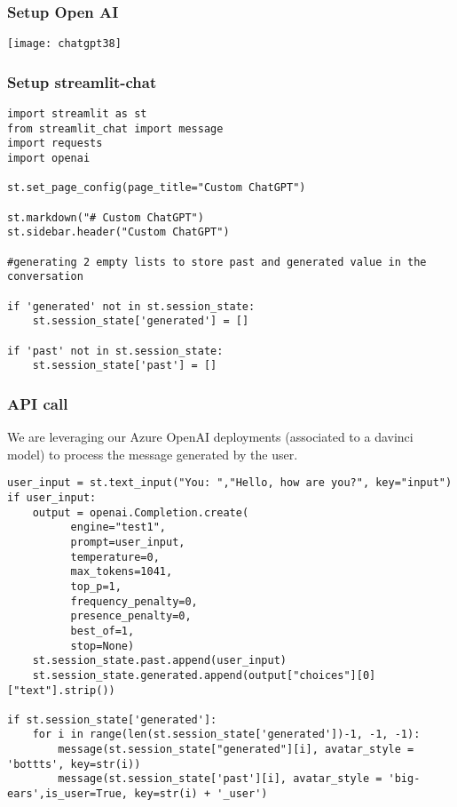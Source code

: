 \begin{frame}[fragile]\frametitle{ Setup Open AI}

\begin{center}
\texttt{[image: chatgpt38]}
\end{center}

\end{frame}

\begin{frame}[fragile]\frametitle{ Setup streamlit-chat }

\begin{lstlisting}
import streamlit as st
from streamlit_chat import message
import requests
import openai

st.set_page_config(page_title="Custom ChatGPT")

st.markdown("# Custom ChatGPT")
st.sidebar.header("Custom ChatGPT")

#generating 2 empty lists to store past and generated value in the conversation

if 'generated' not in st.session_state:
    st.session_state['generated'] = []

if 'past' not in st.session_state:
    st.session_state['past'] = []

\end{lstlisting}	 

\end{frame}

\begin{frame}[fragile]\frametitle{API call }
We are leveraging our Azure OpenAI deployments (associated to a davinci model) to process the message generated by the user.


\begin{lstlisting}
user_input = st.text_input("You: ","Hello, how are you?", key="input")
if user_input:
    output = openai.Completion.create(
          engine="test1",
          prompt=user_input,
          temperature=0,
          max_tokens=1041,
          top_p=1,
          frequency_penalty=0,
          presence_penalty=0,
          best_of=1,
          stop=None)
    st.session_state.past.append(user_input)
    st.session_state.generated.append(output["choices"][0]["text"].strip())
		
if st.session_state['generated']:
    for i in range(len(st.session_state['generated'])-1, -1, -1):
        message(st.session_state["generated"][i], avatar_style = 'bottts', key=str(i))
        message(st.session_state['past'][i], avatar_style = 'big-ears',is_user=True, key=str(i) + '_user')		
\end{lstlisting}	 


\end{frame}

